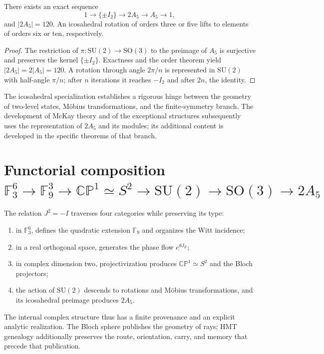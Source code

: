 \begin{proposition}
\label{prop:extension-central-2A5-anexo}
There exists an exact sequence
\begin{equation}
 1\longrightarrow\{\pm I_2\}
 \longrightarrow2A_5
 \longrightarrow A_5
 \longrightarrow1,
 \label{eq:sucesion-2A5-anexo}
\end{equation}
and \(|2A_5|=120\). An icosahedral rotation of orders three or five lifts to
elements of orders six or ten, respectively.
\end{proposition}

\begin{proof}
The restriction of \(\pi:\mathrm{SU}(2)\to\mathrm{SO}(3)\) to the preimage of \(A_5\) is surjective and preserves the kernel \(\{\pm I_2\}\). Exactness and the order theorem yield \(|2A_5|=2|A_5|=120\). A rotation through angle \(2\pi/n\) is represented in \(\mathrm{SU}(2)\) with half-angle \(\pi/n\); after \(n\) iterations it reaches \(-I_2\) and after \(2n\), the identity.
\end{proof}

The icosahedral specialization establishes a rigorous hinge between the geometry of two-level states, Möbius transformations, and the finite-symmetry branch. The development of McKay theory and of the exceptional structures subsequently uses the representation of \(2A_5\) and its modules; its additional content is developed in the specific theorems of that branch.

\section{Functorial composition \texorpdfstring{\(\mathbb F_3^6\to\mathbb F_9^3\to\mathbb{CP}^{1}\simeq S^2\to\mathrm{SU}(2)\to\mathrm{SO}(3)\to 2A_5\)}{F3^6 -> F9^3 -> CP1 -> S2 -> SU(2) -> SO(3) -> 2A5}}

The relation \(J^2=-I\) traverses four categories while preserving its type:
\begin{enumerate}
 \item in \(\mathbb F_3^6\), defines the quadratic extension
       \(\mathbb F_9\) and organizes the Witt incidence;
 \item in a real orthogonal space, generates the phase flow
       \(e^{\theta J_E}\);
 \item in complex dimension two, projectivization produces
       \(\mathbb{CP}^{1}\simeq S^2\) and the Bloch projectors;
 \item the action of \(\mathrm{SU}(2)\) descends to rotations and
       Möbius transformations, and its icosahedral preimage produces
       \(2A_5\).
\end{enumerate}
The internal complex structure thus has a finite provenance and an explicit
analytic realization. The Bloch sphere publishes the geometry of rays; HMT
genealogy additionally preserves the route, orientation, carry, and memory
that precede that publication.

